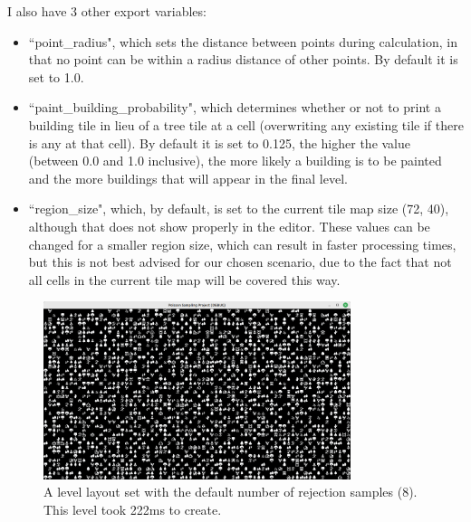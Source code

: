 \newpage

I also have 3 other export variables:

\begin{itemize}
    \item ``point\_radius", which sets the distance between points during calculation, in that no point can be within a radius distance of other points. By default it is set to 1.0.
    \item ``paint\_building\_probability", which determines whether or not to print a building tile in lieu of a tree tile at a cell (overwriting any existing tile if there is any at that cell). By default it is set to 0.125, the higher the value (between 0.0 and 1.0 inclusive), the more likely a building is to be painted and the more buildings that will appear in the final level.
    \item ``region\_size", which, by default, is set to the current tile map size (72, 40), although that does not show properly in the editor. These values can be changed for a smaller region size, which can result in faster processing times, but this is not best advised for our chosen scenario, due to the fact that not all cells in the current tile map will be covered this way.
\end{itemize}

\begin{figure}[H]
    \centering
    \includegraphics[width=0.8\textwidth]{Images/default-poisson-result.png}
    \caption{A level layout set with the default number of rejection samples (8). This level took 222ms to create.}
    \label{fig:poisson1}
\end{figure}

